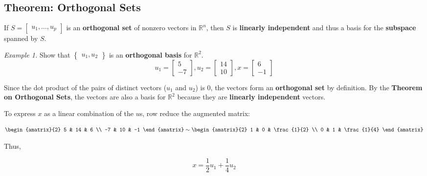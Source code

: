 \documentclass[12pt, letterpaper]{article}
\begin{document}
  \subsection*{Theorem: Orthogonal Sets}

  If $ S =
  \begin{bmatrix}
    u_1, \hdots, u_p
  \end{bmatrix} $ is an \textbf{orthogonal set} of nonzero vectors in
  $ \mathbb{R}^n $, then $ S $ is \textbf{linearly independent} and
  thus a basis for the \textbf{subspace} spanned by $ S $.

  \bigskip

  \textit{Example 1.} Show that $
  \begin{Bmatrix}
    u_1, u_2
  \end{Bmatrix} $ is an \textbf{orthogonal basis} for $ \mathbb{R}^2 $.
  \[
    u_1 =
    \begin{bmatrix}
      5 \\
      -7
    \end{bmatrix},
    u_2 =
    \begin{bmatrix}
      14 \\
      10
    \end{bmatrix},
    x =
    \begin{bmatrix}
      6 \\
      -1
    \end{bmatrix}
  \]
  \medskip

  Since the dot product of the pairs of distinct vectors ($ u_1 $ and
  $ u_2 $) is $ 0 $, the vectors form an \textbf{orthogonal set} by
  definition. By the \textbf{Theorem on Orthogonal Sets}, the vectors
  are also a basis for $ \mathbb{R}^2 $ because they are
  \textbf{linearly independent} vectors.
  \bigskip

  To express $ x $ as a linear combination of the $ u $s, row reduce
  the augmented matrix:

  \[\displaystyle
    \begin{amatrix}{2}
      5 & 14 & 6 \\
      -7 & 10 & -1
    \end{amatrix}
    \sim
    \begin{amatrix}{2}
      1 & 0 & \frac{1}{2} \\
      0 & 1 & \frac{1}{4}
    \end{amatrix}
  \]

  Thus,

  \[\displaystyle
    x = \frac{1}{2}u_1 + \frac{1}{4}u_2
  \]
\end{document}
